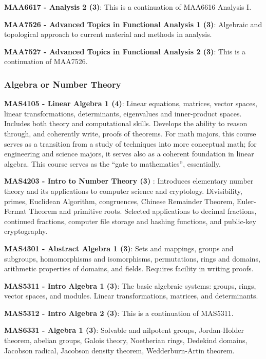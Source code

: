 \documentclass[11pt]{article}
\begin{document}
\textbf{MAA6617 - Analysis 2 (3)}: This is a continuation of MAA6616 Analysis I.

\textbf{MAA7526 - Advanced Topics in Functional Analysis 1 (3)}: Algebraic and topological approach to current material and methods in analysis.

\textbf{MAA7527 - Advanced Topics in Functional Analysis 2 (3)}: This is a continuation of MAA7526.

\subsubsection{\colorbox{alg}{Algebra or Number Theory}}

\textbf{MAS4105 - Linear Algebra 1 (4)}: Linear equations, matrices, vector spaces, linear transformations, determinants, eigenvalues and inner-product spaces. Includes both theory and computational skills. Develops the ability to reason through, and coherently write, proofs of theorems. For math majors, this course serves as a transition from a study of techniques into more conceptual math; for engineering and science majors, it serves also as a coherent foundation in linear algebra. This course serves as the ``gate to mathematics'', essentially.

\textbf{MAS4203 - Intro to Number Theory (3)
}: Introduces elementary number theory and its applications to computer science and cryptology. Divisibility, primes, Euclidean Algorithm, congruences, Chinese Remainder Theorem, Euler-Fermat Theorem and primitive roots. Selected applications to decimal fractions, continued fractions, computer file storage and hashing functions, and public-key cryptography.

\textbf{MAS4301 - Abstract Algebra 1 (3)}: Sets and mappings, groups and subgroups, homomorphisms and isomorphisms, permutations, rings and domains, arithmetic properties of domains, and fields. Requires facility in writing proofs.

\textbf{MAS5311 - Intro Algebra 1 (3)}: The basic algebraic systems: groups, rings, vector spaces, and modules. Linear transformations, matrices, and determinants.

\textbf{MAS5312 - Intro Algebra 2 (3)}: 
This is a continuation of MAS5311.

\textbf{MAS6331 - Algebra 1 (3)}: Solvable and nilpotent groups, Jordan-Holder theorem, abelian groups, Galois theory, Noetherian rings, Dedekind domains, Jacobson radical, Jacobson density theorem, Wedderburn-Artin theorem.
\end{document}
